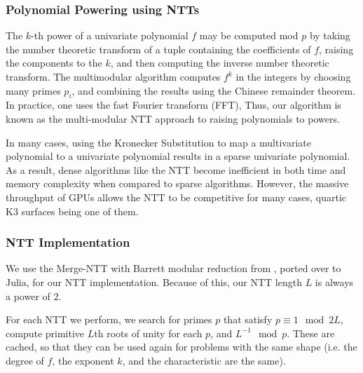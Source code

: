 \subsubsection{Polynomial Powering using NTTs}
The \(k\)-th power of a univariate polynomial \(f\)
may be computed mod \(p\) by taking the number theoretic transform 
of a tuple containing the coefficients of \(f\),
raising the components to the \(k\),
and then computing the inverse number theoretic transform.
The multimodular algorithm 
computes \(f^{k}\) in the integers by
choosing many primes \(p_{i}\), 
and combining the results using the Chinese remainder theorem.
In practice, one uses the fast Fourier transform (FFT),
Thus, our algorithm is known as the 
multi-modular NTT approach to raising polynomials to powers.

In many cases, using the Kronecker Substitution to map a multivariate polynomial to a univariate polynomial results in 
a sparse univariate polynomial. As a result, dense algorithms like the NTT become inefficient in both time and memory complexity when compared to sparse algorithms.
However, the massive throughput of GPUs allows the NTT to be competitive for many cases, 
quartic K3 surfaces being one of them.

\subsubsection{NTT Implementation}

We use the Merge-NTT with Barrett modular reduction from \cite{ozcan-2023-fft}, ported over to Julia, for our NTT implementation. 
Because of this, our NTT length $L$ is always a power of $2$. 

For each NTT we perform, we search for primes $p$ that satisfy 
$p \equiv 1 \mod 2L$, compute primitive $L$th roots of unity 
for each $p$, and $L^{-1} \mod p$. 
These are cached, so that they can be used again for problems with the same shape 
(i.e. the degree of \(f\), the exponent \(k\), and the characteristic are the same).


